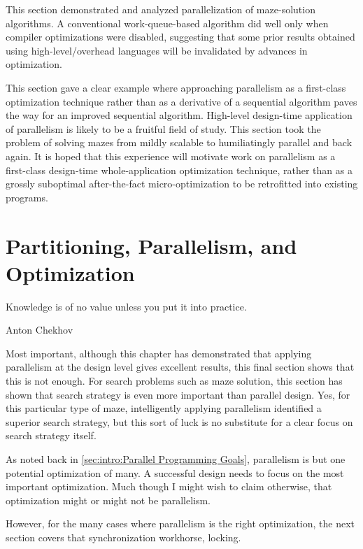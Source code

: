 This section demonstrated and analyzed parallelization of maze-solution
algorithms.
A conventional work-queue-based algorithm did well only when compiler
optimizations were disabled, suggesting that some prior results obtained
using high-level/overhead languages will be invalidated
by advances in optimization.

This section gave a clear example where approaching parallelism
as a first-class optimization technique rather than as a derivative of a
sequential algorithm paves the way for an improved sequential algorithm.
High-level design-time application of parallelism is likely to be a
fruitful field of study.
This section took the problem of solving mazes from mildly scalable
to humiliatingly parallel and back again.
It is hoped that this experience will motivate work on parallelism
as a first-class design-time whole-application optimization technique,
rather than as a grossly suboptimal after-the-fact micro-optimization
to be retrofitted into existing programs.

\section{Partitioning, Parallelism, and Optimization}
\label{sec:SMPdesign:Partitioning; Parallelism; and Optimization}
%
\epigraph{Knowledge is of no value unless you put it into practice.}
	 {Anton Chekhov}

Most important, although this chapter has demonstrated that applying
parallelism at the design level gives excellent results, this final
section shows that this is not enough.
For search problems such as maze solution, this section has shown that
search strategy is even more important than parallel design.
Yes, for this particular type of maze, intelligently applying parallelism
identified a superior search strategy, but this sort of luck is no
substitute for a clear focus on search strategy itself.

As noted back in \cref{sec:intro:Parallel Programming Goals},
parallelism is but one potential optimization of many.
A successful design needs to focus on the most important optimization.
Much though I might wish to claim otherwise, that optimization might
or might not be parallelism.

However, for the many cases where parallelism is the right optimization,
the next section covers that synchronization workhorse, locking.
